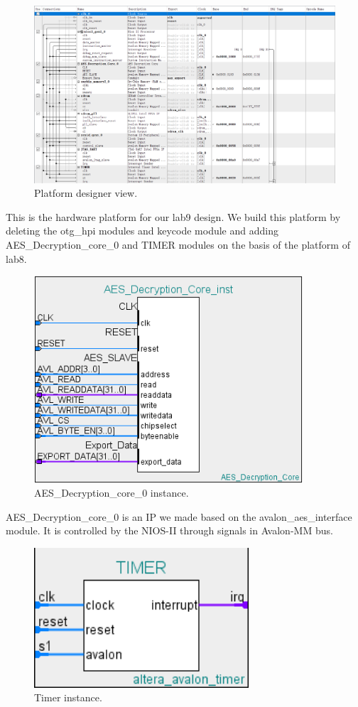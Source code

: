 \documentclass[12pt]{article}
\begin{document}
\begin{figure}[H]
    \centering
    \includegraphics[width=18cm]{platform.png}
    \caption{Platform designer view.}
\end{figure}

This is the hardware platform for our lab9 design. We build this platform by deleting the otg\_hpi modules and keycode module and adding AES\_Decryption\_core\_0 and TIMER modules on the basis of the platform of lab8. 

\begin{figure}[H]
    \centering
    \includegraphics[width=10cm]{AES_decryption_core.png}
    \caption{AES\_Decryption\_core\_0 instance.}
\end{figure}

AES\_Decryption\_core\_0 is an IP we made based on the avalon\_aes\_interface module. It is controlled by the NIOS-II through signals in Avalon-MM bus. 

\begin{figure}[H]
    \centering
    \includegraphics[width=8cm]{timer.png}
    \caption{Timer instance.}
\end{figure}
\end{document}
